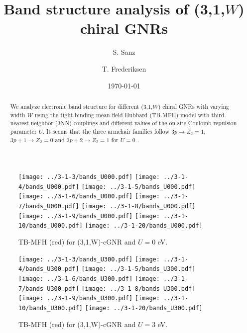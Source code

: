 \documentclass[twocolumn,amsmath,%
amssymb,prb,superscriptaddress]{revtex4}
\begin{document}
\title{Band structure analysis of (3,1,$W$) chiral GNRs}

\author{S. Sanz}

\author{T. Frederiksen}

\date{\today}

\begin{abstract}
We analyze electronic band structure for different (3,1,$W$) chiral GNRs with varying width 
$W$ using the tight-binding mean-field Hubbard (TB-MFH) model 
with third-nearest neighbor (3NN) couplings and
different values of the on-site Coulomb repulsion parameter $U$. It seems that the three armchair families follow $3p\rightarrow Z_{2}=1$, $3p+1\rightarrow Z_{2}=0$ and $3p+2\rightarrow Z_{2}=1$ for $U=0$ .
\end{abstract}

\maketitle

\begin{figure*}
	\texttt{[image: ../3-1-3/bands\_U000.pdf]}
	\texttt{[image: ../3-1-4/bands\_U000.pdf]}
	\texttt{[image: ../3-1-5/bands\_U000.pdf]}\\
	\texttt{[image: ../3-1-6/bands\_U000.pdf]}
	\texttt{[image: ../3-1-7/bands\_U000.pdf]}
	\texttt{[image: ../3-1-8/bands\_U000.pdf]}\\
	\texttt{[image: ../3-1-9/bands\_U000.pdf]}
	\texttt{[image: ../3-1-10/bands\_U000.pdf]}
	\texttt{[image: ../3-1-20/bands\_U000.pdf]}
	\caption{TB-MFH (red) for (3,1,W)-cGNR and $U=0$ eV.} 
\end{figure*}

\begin{figure*}
	\texttt{[image: ../3-1-3/bands\_U300.pdf]}
	\texttt{[image: ../3-1-4/bands\_U300.pdf]}
	\texttt{[image: ../3-1-5/bands\_U300.pdf]}\\
	\texttt{[image: ../3-1-6/bands\_U300.pdf]}
	\texttt{[image: ../3-1-7/bands\_U300.pdf]}
	\texttt{[image: ../3-1-8/bands\_U300.pdf]}\\	
	\texttt{[image: ../3-1-9/bands\_U300.pdf]}
	\texttt{[image: ../3-1-10/bands\_U300.pdf]}
	\texttt{[image: ../3-1-20/bands\_U300.pdf]}
	\caption{TB-MFH (red) for (3,1,W)-cGNR and $U=3$ eV.} 
\end{figure*}
\end{document}
